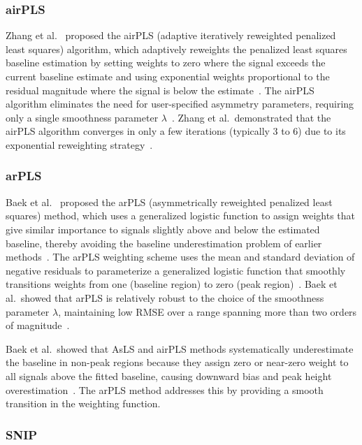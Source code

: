 \subsubsection{airPLS}

Zhang et al.~\cite{zhang2010airpls} proposed the airPLS (adaptive iteratively reweighted penalized least squares) algorithm, which adaptively reweights the penalized least squares baseline estimation by setting weights to zero where the signal exceeds the current baseline estimate and using exponential weights proportional to the residual magnitude where the signal is below the estimate~\cite{zhang2010airpls}. The airPLS algorithm eliminates the need for user-specified asymmetry parameters, requiring only a single smoothness parameter $\lambda$~\cite{zhang2010airpls}. Zhang et al.\ demonstrated that the airPLS algorithm converges in only a few iterations (typically 3 to 6) due to its exponential reweighting strategy~\cite{zhang2010airpls}.

\subsubsection{arPLS}

Baek et al.~\cite{baek2015arpls} proposed the arPLS (asymmetrically reweighted penalized least squares) method, which uses a generalized logistic function to assign weights that give similar importance to signals slightly above and below the estimated baseline, thereby avoiding the baseline underestimation problem of earlier methods~\cite{baek2015arpls}. The arPLS weighting scheme uses the mean and standard deviation of negative residuals to parameterize a generalized logistic function that smoothly transitions weights from one (baseline region) to zero (peak region)~\cite{baek2015arpls}. Baek et al.\ showed that arPLS is relatively robust to the choice of the smoothness parameter $\lambda$, maintaining low RMSE over a range spanning more than two orders of magnitude~\cite{baek2015arpls}.

Baek et al.\ showed that AsLS and airPLS methods systematically underestimate the baseline in non-peak regions because they assign zero or near-zero weight to all signals above the fitted baseline, causing downward bias and peak height overestimation~\cite{baek2015arpls}. The arPLS method addresses this by providing a smooth transition in the weighting function.

\subsubsection{SNIP}

